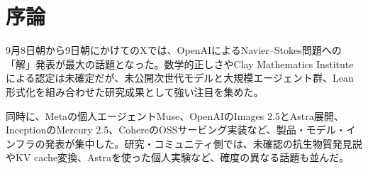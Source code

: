 \section{序論}
9月8日朝から9日朝にかけてのXでは、OpenAIによるNavier--Stokes問題への「解」発表が最大の話題となった。数学的正しさやClay Mathematics Instituteによる認定は未確定だが、未公開次世代モデルと大規模エージェント群、Lean形式化を組み合わせた研究成果として強い注目を集めた。

同時に、Metaの個人エージェントMuse、OpenAIのImages 2.5とAstra展開、InceptionのMercury 2.5、CohereのOSSサービング実装など、製品・モデル・インフラの発表が集中した。研究・コミュニティ側では、未確認の抗生物質発見説やKV cache変換、Astraを使った個人実験など、確度の異なる話題も並んだ。
